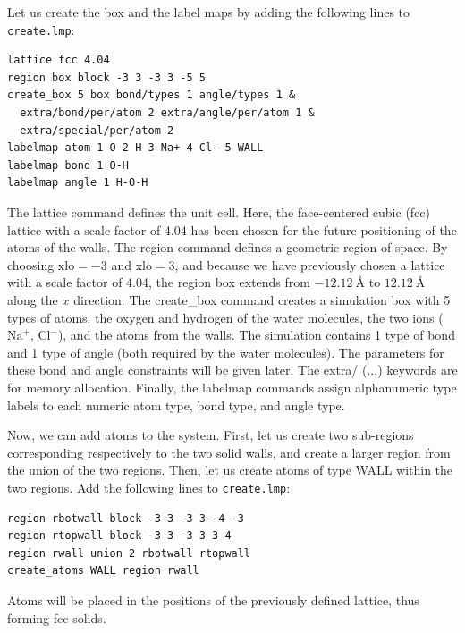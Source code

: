 \documentclass[9pt,tutorial]{livecoms}
\newcommand{\lmpcmd}[1]{\hspace{0pt}\colorbox{listing}{\textcolor{command}{\small{#1}}}\hspace{0pt}} %
\newcommand{\flecmd}[1]{\textcolor{command}{\texttt{#1}}} %
\begin{document}
Let us create the box and the label maps by adding the following lines to \flecmd{create.lmp}:
\begin{lstlisting}
lattice fcc 4.04
region box block -3 3 -3 3 -5 5
create_box 5 box bond/types 1 angle/types 1 &
  extra/bond/per/atom 2 extra/angle/per/atom 1 &
  extra/special/per/atom 2
labelmap atom 1 O 2 H 3 Na+ 4 Cl- 5 WALL
labelmap bond 1 O-H
labelmap angle 1 H-O-H
\end{lstlisting}
The \lmpcmd{lattice} command defines the unit cell.  Here, the face-centered cubic (fcc) lattice
with a scale factor of 4.04 has been chosen for the future positioning of the atoms
of the walls.  The \lmpcmd{region} command defines a geometric region of space.  By choosing
$\text{xlo}=-3$ and $\text{xlo}=3$, and because we have previously chosen a lattice with a scale
factor of 4.04, the region box extends from $-12.12~\text{\AA{}}$ to $12.12~\text{\AA{}}$
along the $x$ direction.  The \lmpcmd{create\_box} command creates a simulation box with
5 types of atoms: the oxygen and hydrogen of the water molecules, the two ions ($\text{Na}^+$,
$\text{Cl}^-$), and the atoms from the walls.  The simulation contains 1 type of bond
and 1 type of angle (both required by the water molecules).
The parameters for these bond and angle constraints will be given later.  The \lmpcmd{extra/ (...)}
keywords are for memory allocation.  Finally, the \lmpcmd{labelmap} commands assign
alphanumeric type labels to each numeric atom type, bond type, and angle type.

Now, we can add atoms to the system.  First, let us create two sub-regions corresponding
respectively to the two solid walls, and create a larger region from the union of the
two regions.  Then, let us create atoms of type WALL within the two regions.  Add the
following lines to \flecmd{create.lmp}:
\begin{lstlisting}
region rbotwall block -3 3 -3 3 -4 -3
region rtopwall block -3 3 -3 3 3 4
region rwall union 2 rbotwall rtopwall
create_atoms WALL region rwall
\end{lstlisting}
Atoms will be placed in the positions of the previously defined lattice, thus
forming fcc solids.
\end{document}
